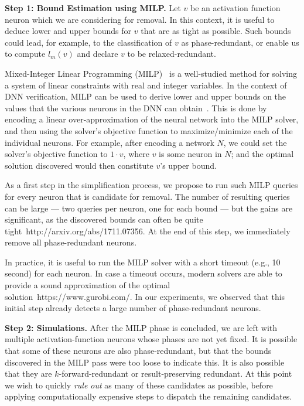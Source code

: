 \documentclass[10pt, conference, twocolumn, compsocconf]{IEEEtran}
\theoremstyle{remark}
\newcommand{\kfr}{$k$-forward-redundant}
\newcommand{\errorMinimizerFunction}{l_m}
\begin{document}
\medskip
\noindent
\textbf{Step 1: Bound Estimation using MILP.}
Let $v$ be an activation function neuron which we are considering for
removal. In this context, it is useful to deduce lower and upper
bounds for $v$ that are as tight as possible. Such bounds could lead,
for example, to the classification of $v$ as phase-redundant, or
enable us to compute $\errorMinimizerFunction(v)$ and declare $v$ to
be relaxed-redundant.

Mixed-Integer Linear Programming (MILP)~\cite{Dantzig1963} is a
well-studied method for solving a system of linear constraints with
real and integer variables. In the context of DNN verification, MILP
can be used to derive lower and upper bounds on the values that the
various neurons in the DNN can obtain~\cite{Ehlers2017,TjXiTe17}. This
is done by encoding a linear over-approximation of the neural network
into the MILP solver, and then using the solver's objective function
to maximize/minimize each of the individual neurons. For example,
after encoding a network $N$, we could set the solver's objective
function to $1\cdot v$, where $v$ is some neuron in $N$; and the
optimal solution discovered would then constitute $v$'s upper bound.

As a first step in the simplification process, we propose to run such
MILP queries for every neuron that is candidate for removal. The
number of resulting queries can be large --- two queries per neuron,
one for each bound --- but the gains are significant, as the
discovered bounds can often be quite tight~http://arxiv.org/abs/1711.07356. At the end
of this step, we immediately remove all phase-redundant neurons.

In practice, it is useful to run the MILP solver with a short timeout
(e.g., 10 second)
for each neuron. In case a timeout occurs, modern
solvers are able to provide a sound approximation of the optimal
solution~https://www.gurobi.com/.  In our experiments, we observed that this
initial step already detects a large number of phase-redundant
neurons.
%
%

\medskip
\noindent
\textbf{Step 2: Simulations.}  After the MILP phase is concluded, we
are left with multiple activation-function neurons whose phases are
not yet fixed. It is possible that some of these neurons are also
phase-redundant, but that the bounds discovered in the MILP pass were
too loose to indicate this. It is also possible that they are \kfr{}
or result-preserving redundant.  At this point we wish to quickly
\emph{rule out} as many of these candidates as possible, before
applying computationally expensive steps to dispatch the remaining
candidates.
\end{document}
